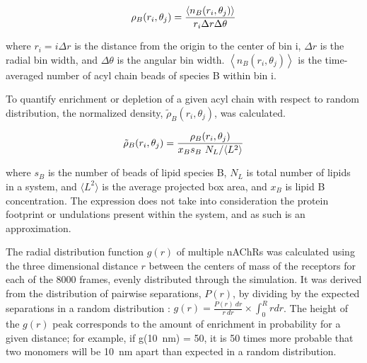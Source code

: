  \begin{equation}
      \rho_{B}(r_i,\theta_j)= \frac{\left\langle n_{B}(r_i,\theta_j) \right\rangle}{r_i \Delta{r}\Delta{\theta}} \\        
    \label{eq:R}
  \end{equation}

where $r_i = i \Delta r$ is the distance from the origin to the center of bin i, $\Delta r$ is the radial bin width, and $\Delta \theta$ is the angular bin width. $\left\langle n_{B}(r_i,\theta_j) \right\rangle$ is the time-averaged number of acyl chain beads of species B within bin i.

To quantify enrichment or depletion of a given acyl chain with respect to random distribution, the normalized density, $ \tilde{\rho}_{B}(r_i,\theta_j)$, was calculated.

  \begin{equation}
  \tilde{\rho}_{B}(r_i,\theta_j)=\frac{ \rho_{B}(r_i,\theta_j)}{x_{B}s_{B}~N_{L}/\langle L^{2}\rangle} \\        
    \label{eq:Rt}
  \end{equation}
  
  where $s_B$ is the number of beads of lipid species B, $N_L$ is total number of lipids in a system, and $\langle L^{2}\rangle$ is the average projected box area, and $x_B$ is lipid B concentration. The expression does not take into consideration the protein footprint or undulations present within the system, and as such is an approximation.





The radial distribution function $g(r)$ of multiple nAChRs was calculated using the three dimensional distance $r$ between the centers of mass of the receptors for each of the 8000 frames, evenly distributed through the simulation. %
It was derived from the distribution of pairwise separations, $P(r)$, by dividing by the expected separations in a random distribution : $g(r) = \frac{P(r)~dr}{r~dr}\times\int_{0}^{R} r dr$.  
The height of the $g(r)$ peak corresponds to the amount of enrichment in probability for a given distance; for example, if g(10~nm) = 50, it is 50 times more probable that two monomers will be 10~nm apart than expected in a random distribution.

